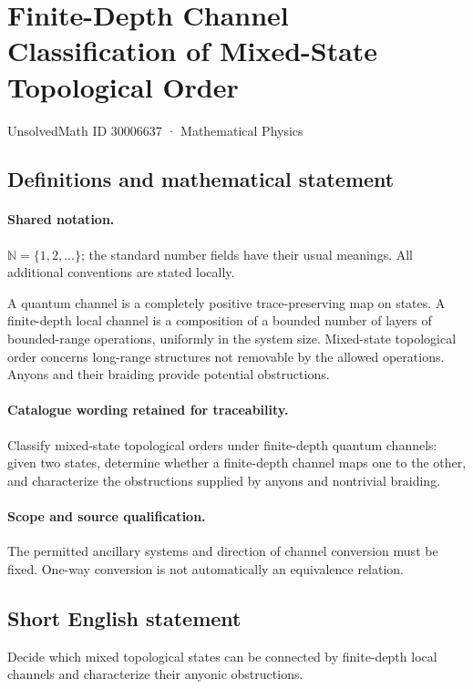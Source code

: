 \documentclass[11pt]{article}
\begin{document}
\setcounter{section}{30006636}
\section{Finite-Depth Channel Classification of Mixed-State Topological Order}\label{30006637}
{\small UnsolvedMath ID 30006637 · Mathematical Physics}
\subsection{Definitions and mathematical statement}

\paragraph{Shared notation.}$\mathbb N=\{1,2,\ldots\}$; the standard number fields have their usual meanings. All additional conventions are stated locally.


A quantum channel is a completely positive trace-preserving map on states. A finite-depth local channel is a composition of a bounded number of layers of bounded-range operations, uniformly in the system size. Mixed-state topological order concerns long-range structures not removable by the allowed operations. Anyons and their braiding provide potential obstructions.

\paragraph{Catalogue wording retained for traceability.}
Classify mixed-state topological orders under finite-depth quantum channels: given two states, determine whether a finite-depth channel maps one to the other, and characterize the obstructions supplied by anyons and nontrivial braiding.

\paragraph{Scope and source qualification.}The permitted ancillary systems and direction of channel conversion must be fixed. One-way conversion is not automatically an equivalence relation.
\subsection{Short English statement}
Decide which mixed topological states can be connected by finite-depth local channels and characterize their anyonic obstructions.
\end{document}
